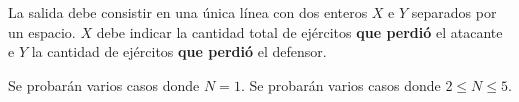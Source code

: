 \documentclass{oci}
\begin{document}
\begin{outputDescription}
  La salida debe consistir en una única línea con dos enteros $X$ e $Y$ separados por un espacio.
  $X$ debe indicar la cantidad total de ejércitos {\bf que perdió} el
  atacante e $Y$ la cantidad de ejércitos {\bf que perdió} el defensor.
\end{outputDescription}

\begin{scoreDescription}
   Se probarán varios casos donde $N=1$.
   Se probarán varios casos donde $2\leq N \leq 5$.
\end{scoreDescription}

\begin{sampleDescription}
\end{sampleDescription}
\end{document}
